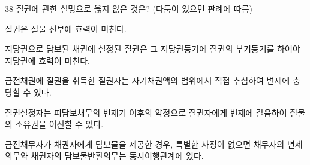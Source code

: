 \begin{question}{38}
질권에 관한 설명으로 옳지 않은 것은? (다툼이 있으면 판례에 따름)
\begin{choices}
  \item 질권은 질물 전부에 효력이 미친다.
  \item 저당권으로 담보된 채권에 설정된 질권은 그 저당권등기에 질권의 부기등기를 하여야 저당권에 효력이 미친다.
  \item 금전채권에 질권을 취득한 질권자는 자기채권액의 범위에서 직접 추심하여 변제에 충당할 수 있다.
  \item 질권설정자는 피담보채무의 변제기 이후의 약정으로 질권자에게 변제에 갈음하여 질물의 소유권을 이전할 수 있다.
  \item 금전채무자가 채권자에게 담보물을 제공한 경우, 특별한 사정이 없으면 채무자의 변제의무와 채권자의 담보물반환의무는 동시이행관계에 있다.
\end{choices}
\end{question}
